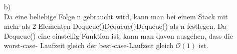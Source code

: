 \documentclass[a4paper,11pt,fleqn]{scrartcl}
\begin{document}
\begin{enumerate}
\begin{enumerate}
\begin{algorithmic}
						\Else
							\EndWhile
							\EndWhile
						\EndIf
					\EndFunction
			\end{algorithmic}	
			\item[b)]\quad \\
				Da eine beliebige Folge n gebraucht wird, kann man bei einem Stack mit mehr als 2 
				Elementen Dequeue()Dequeue()Dequeue() als n festlegen.
				Da Dequeue() eine einstellig Funktion ist, kann man davon ausgehen, dass die worst-case-
				Laufzeit gleich der best-case-Laufzeit gleich $\mathcal{O}(1)$ ist.
		\end{enumerate}
	\end{enumerate}
\end{document}
